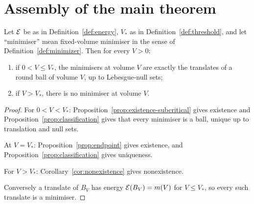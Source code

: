 \chapter{Assembly of the main theorem}\label{ch:assembly}

\begin{theorem}\label{thm:main}
Let $\mathcal E$ be as in Definition~\ref{def:energy}, $V_*$ as in
Definition~\ref{def:threshold}, and let ``minimiser'' mean fixed-volume
minimiser in the sense of Definition~\ref{def:minimizer}.  Then for every
$V>0$:
\begin{enumerate}[label=(\roman*)]
\item if $0<V\le V_*$, the minimisers at volume $V$ are exactly the translates
  of a round ball of volume $V$, up to Lebesgue-null sets;
\item if $V>V_*$, there is no minimiser at volume $V$.
\end{enumerate}
\end{theorem}

\begin{proof}
For $0<V<V_*$: Proposition~\ref{prop:existence-subcritical} gives existence and
Proposition~\ref{prop:classification} gives that every minimiser is a ball,
unique up to translation and null sets.

At $V=V_*$: Proposition~\ref{prop:endpoint} gives existence, and
Proposition~\ref{prop:classification} gives uniqueness.

For $V>V_*$: Corollary~\ref{cor:nonexistence} gives nonexistence.

Conversely a translate of $B_V$ has energy $\mathcal E(B_V)=m(V)$ for
$V\le V_*$, so every such translate is a minimiser.
\end{proof}

